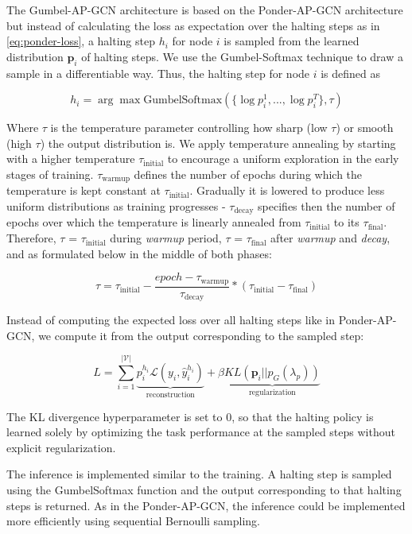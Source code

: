 \documentclass{gdl}
\begin{document}
The Gumbel-AP-GCN architecture is based on the Ponder-AP-GCN architecture but instead of calculating the loss as expectation over the halting steps as in \autoref{eq:ponder-loss}, a halting step $h_i$ for node $i$ is sampled from the learned distribution $\mathbf{p}_i$ of halting steps. We use the Gumbel-Softmax technique \cite{Maddison2017, Jang2017} to draw a sample in a differentiable way. Thus, the halting step for node $i$ is defined as

$$
    h_i = \arg\max \text{GumbelSoftmax}(\{\log p_i^1,...,\log p_i^{T}\}, \tau)
$$

\noindent Where $\tau$ is the temperature parameter controlling how sharp (low $\tau$) or smooth (high $\tau$) the output distribution is. We apply temperature annealing by starting with a higher temperature $\tau_{\text{initial}}$ to encourage a uniform exploration in the early stages of training. $\tau_{\text{warmup}}$ defines the number of epochs during which the temperature is kept constant at $\tau_{\text{initial}}$. Gradually it is lowered to produce less uniform distributions as training progresses - $\tau_{\text{decay}}$ specifies then the number of epochs over which the temperature is linearly annealed from $\tau_{\text{initial}}$ to its $\tau_{\text{final}}$.
Therefore, $\tau$ = $\tau_{\text{initial}}$ during \textit{warmup} period, $\tau$ = $\tau_{\text{final}}$ after \textit{warmup} and \textit{decay}, and as formulated below in the middle of both phases:

$$
\tau = \tau_{\text{initial}} - \frac{epoch - \tau_{\text{warmup}}}{\tau_{\text{decay}}}  * (\tau_{\text{initial}} - \tau_{\text{final}})
$$

Instead of computing the expected loss over all halting steps like in Ponder-AP-GCN, we compute it from the output corresponding to the sampled step:

$$
L = \sum_{i=1}^{\mathcal{|V|}} \underbrace{p_i^{h_i} \mathcal{L}(y_i, \hat{y}_i^{h_i})}_{\text{reconstruction}} + \beta \underbrace{KL(\mathbf{p}_i || p_G(\lambda_p))}_{\text{regularization}}
$$

\noindent The KL divergence hyperparameter is set to 0, so that the halting policy is learned solely by optimizing the task performance at the sampled steps without explicit regularization. 

The inference is implemented similar to the training. A halting step is sampled using the GumbelSoftmax function and the output corresponding to that halting steps is returned. As in the Ponder-AP-GCN, the inference could be implemented more efficiently using sequential Bernoulli sampling.
\end{document}
